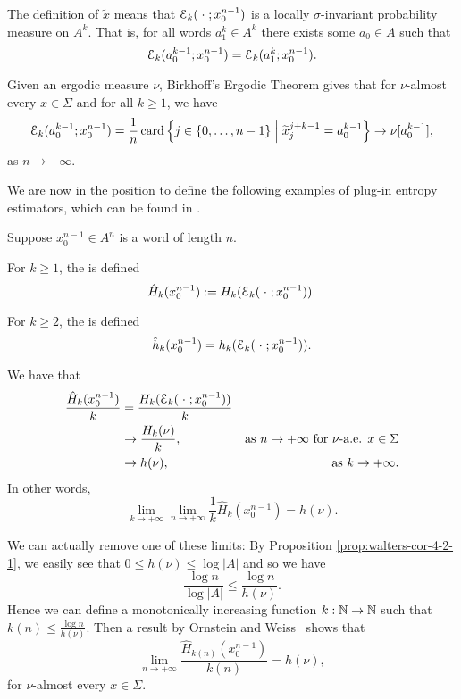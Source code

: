 The definition of $\tilde{x}$ means that $\mathcal{E}_k(\mathrel{}\cdot\mathrel{}; x_0^{n - 1})$ is a locally $\sigma$-invariant probability measure on $A^k$. That is, for all words $a_1^k \in A^k$ there exists some $a_0 \in A$ such that
\[
	\mathcal{E}_k(a_0^{k - 1}; x_0^{n - 1}) = \mathcal{E}_k(a_1^k; x_0^{n - 1}).
\]

Given an ergodic measure $\nu$, Birkhoff's Ergodic Theorem gives that for $\nu$-almost every $x \in \Sigma$ and for all $k \geq 1$, we have
\[
	\mathcal{E}_k(a_0^{k - 1}; x_0^{n - 1}) = \frac{1}{n}\operatorname{card}\left\{j \in \{0, \dots, n - 1\} \mathrel{}\middle|\mathrel{} \widetilde{x}_j^{j + k - 1} = a_0^{k - 1} \right\} \to \nu[a_0^{k - 1}],
\]
as $n \to +\infty$.

We are now in the position to define the following examples of plug-in entropy estimators, which can be found in \cite[Definition 2.1]{chazottes-gabrielle:large-deviations}.

\begin{definition}
	Suppose $x_0^{n - 1} \in A^n$ is a word of length $n$.
	
	For $k \geq 1$, the  is defined
	\[
		\hat{H}_k(x_0^{n - 1}) := H_k(\mathcal{E}_k(\mathrel{}\cdot\mathrel{}; x_0^{n - 1})).
	\]
	
	For $k \geq 2$, the  is defined
	\[
		\hat{h}_k(x_0^{n - 1}) = h_k(\mathcal{E}_k(\mathrel{}\cdot\mathrel{}; x_0^{n - 1})).
	\]
\end{definition}

We have that
\begin{align*}
	\frac{\hat{H}_k(x_0^{n - 1})}{k} &= \frac{H_k(\mathcal{E}_k(\mathrel{}\cdot\mathrel{}; x_0^{n - 1}))}{k} \\
		&\to \frac{H_k(\nu)}{k}, & \text{as } n \to +\infty \text{ for } \nu \text{-a.e. } x \in \Sigma  \\
		&\to h(\nu),	& \text{as } k \to +\infty.
\end{align*}
In other words,
\[
	\lim_{k \to +\infty} \lim_{n \to +\infty}{\frac{1}{k} \hat{H}_k(x_0^{n - 1})} = h(\nu).
\]

We can actually remove one of these limits: By Proposition \ref{prop:walters-cor-4-2-1}, we easily see that $0 \leq h(\nu) \leq \log{|A|}$ and so we have
\[
	\frac{\log{n}}{\log{|A|}} \leq \frac{\log{n}}{h(\nu)}.
\]
Hence we can define a monotonically increasing function $k : \mathbb{N} \to \mathbb{N}$ such that $k(n) \leq \frac{\log{n}}{h(\nu)}$. Then a result by Ornstein and Weiss~\cite{shields:ergodic} shows that
\[
	\lim_{n \to +\infty}{\frac{\hat{H}_{k(n)}(x_0^{n -1})}{k(n)}} = h(\nu),
\]
for $\nu$-almost every $x \in \Sigma$.

